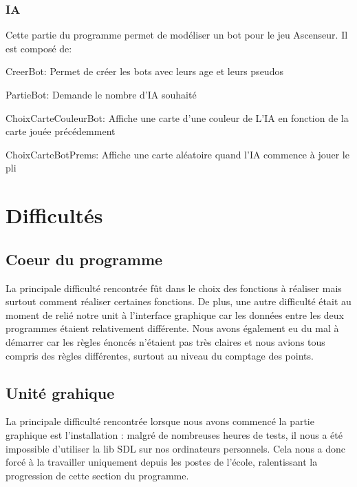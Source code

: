 \documentclass[12pt]{report}
\begin{document}
  \subsubsection{IA}
  
  Cette partie du programme permet de modéliser un bot pour le jeu Ascenseur. Il est composé de: \\
  
  	\item[CreerBot:] Permet de créer les bots avec leurs age et leurs pseudos
	\item[PartieBot:] Demande le nombre d'IA souhaité
	\item[ChoixCarteCouleurBot:] Affiche une carte d'une couleur de L'IA en fonction de la carte jouée précédemment
	\item[ChoixCarteBotPrems:] Affiche une carte aléatoire quand l'IA commence à jouer le pli
	
\section{Difficultés}
	\subsection{Coeur du programme}
	La principale difficulté rencontrée fût dans le choix des fonctions à réaliser mais surtout comment réaliser certaines fonctions. De plus, une autre difficulté était au moment de relié notre unit à l'interface graphique car les données entre les deux programmes étaient relativement différente. Nous avons également eu du mal à démarrer car les règles énoncés n'étaient pas très claires et nous avions tous compris des règles différentes, surtout au niveau du comptage des points.
	
	\subsection{Unité grahique}
	La principale difficulté rencontrée lorsque nous avons commencé la partie graphique est l'installation : malgré de nombreuses heures de tests, il nous a été impossible d'utiliser la lib SDL sur nos ordinateurs personnels. Cela nous a donc forcé à la travailler uniquement depuis les postes de l'école, ralentissant la progression de cette section du programme.\\ 
	
\end{document}
